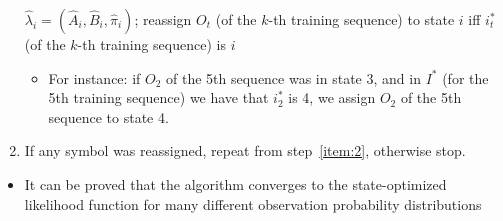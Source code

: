 \documentclass{beamer}
\begin{document}
\begin{frame}[allowframebreaks]
\begin{enumerate}
    $\hat{\lambda}_i = (\hat{A}_i,\hat{B}_i,\hat{\pi}_i)$; reassign $O_t$ (of
    the $k$-th training sequence) to state $i$ iff $i_t^*$ (of the $k$-th
    training sequence) is $i$
    \begin{itemize}
    \item For instance: if $O_2$ of the 5th sequence was in state $3$, and in
      $I^*$ (for the 5th training sequence) we have that $i^*_2$ is 4, we
      assign $O_2$ of the 5th sequence to state 4.
    \end{itemize}
  \item If any symbol was reassigned, repeat from step~\ref{item:2}, otherwise
    stop.
  \end{enumerate}

  \vspace{2ex}

  \begin{itemize}
  \item It can be proved that the algorithm converges to the state-optimized likelihood function for many different observation probability distributions
  \end{itemize}
  
\end{frame}
\end{document}
